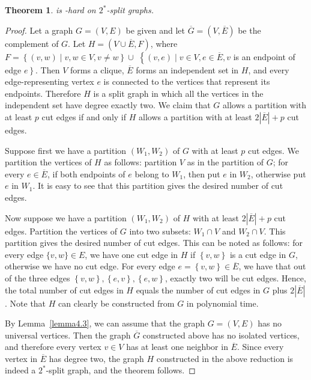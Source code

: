\documentclass[
final
]{dmtcs-episciences}
\newtheorem{theorem}{Theorem}{\bfseries}{\itshape}
\begin{document}
\begin{theorem}\label{theorem4.4}
{} is {}-hard on $2^*$-split graphs.		
\end{theorem}
\begin{proof}
Let a graph $G=(V,E)$ be given and let $\overline{G}=(V,\overline{E})$ be the complement of $G$. Let $H=(V\cup \overline{E}, F)$, where $F=\left\{(v,w)\mid v,w\in V,v\neq w \right\}\cup $ $\left\{(v,e) \mid v\in V, e\in \overline{E}, v\right.$ is an endpoint of edge $\left. e\right\}$. Then $V$ forms a clique, $\overline{E}$ forms an independent set in $H$, and every edge-representing vertex $e$ is connected to the vertices that represent its endpoints. Therefore $H$ is a split graph in which all the vertices in the independent set have  degree exactly two. We claim that $G$ allows a partition with at least $p$ cut edges if and only if $H$ allows a partition with at least $2|\overline{E}|+p$ cut edges.
		
		Suppose first we have a partition $(W_1,W_2)$ of $G$ with at least $p$ cut edges. We partition the vertices of $H$ as follows: partition $V$ as in the partition of $G$; for every $e\in \overline{E}$, if both endpoints of $e$ belong to $W_1$, then put $e$ in $W_2$, otherwise put $e$ in $W_1$. It is easy to see that this partition gives the desired number of cut edges.
		
		Now suppose we have a partition $(W_1,W_2)$ of $H$ with at least $2|\overline{E}|+p$ cut edges. Partition the vertices of $G$ into two subsets: $W_1\cap V$ and $W_2\cap V$. This partition gives the desired number of cut edges. This can be noted as follows: for every edge $\{v,w\}\in E$, we have one cut edge in $H$ if $\left\{v,w\right\}$ is a cut edge in $G$, otherwise we have no cut edge. For every edge $e=\left\{v,w\right\}\in \overline{E}$, we have that out of the three edges $\left\{v,w\right\}, \left\{e,v\right\}, \left\{e,w\right\}$, exactly two will be cut edges. Hence, the total number of cut edges in $H$ equals the number of cut edges in $G$ plus $2|\overline{E}|$. Note that $H$ can clearly be constructed from $G$ in polynomial time.

By Lemma~\ref{lemma4.3}, we can assume that the graph  $G=(V,E)$ has no universal vertices. Then the graph $\overline{G}$ constructed above has no isolated vertices, and therefore every vertex $v\in V$ has at least one neighbor in $\overline{E}$. Since every vertex in $\overline{E}$ has degree two, the graph $H$ constructed in the above reduction is indeed a $2^*$-split graph, and the theorem follows.
\end{proof}
		
\end{document}
